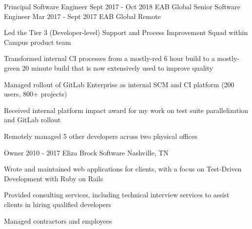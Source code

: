 \begin{cventries}
  \doublecventry
  {Principal Software Engineer}
  {Sept 2017 - Oct 2018}
  {EAB Global}
  {Senior Software Engineer}
  {Mar 2017 - Sept 2017}
  {EAB Global}
  {}
  {Remote}
  {
    \begin{cvitems}
      \item Led the Tier 3 (Developer-level) Support and Process Improvement Squad within Campus product team
      \item Transformed internal CI processes from a mostly-red 6 hour build to a mostly-green 20 minute build that is now extensively used to improve quality
      \item Managed rollout of GitLab Enterprise as internal SCM and CI platform (200 users, 800+ projects)
      \item Received internal platform impact award for my work on test suite parallelization and GitLab rollout
      \item Remotely managed 5 other developers across two physical offices
    \end{cvitems}
    \cvtags{
      \tagRuby
      \tagRails
      \tagMySQL
      \tagCIShort
      \tagTDDShort
      \tagPeopleManagement
      \tagProjectManagement
    }
  }

  \cventry
  {Owner}
  {2010 - 2017}
  {Eliza Brock Software}
  {Nashville, TN}
  {
    \begin{cvitems}
      \item Wrote and maintained web applications for clients, with a focus on Test-Driven \mbox{Development} with Ruby on Rails
      \item Provided consulting services, including technical interview services to assist clients in hiring qualified developers
      \item Managed contractors and employees
    \end{cvitems}
    \cvtags{
      \tagRuby
      \tagHAML
      \tagJavaScript
      \tagSASS
      \tagRails
      \tagPostgreSQL
      \tagCIShort
      \tagTDDShort
      \tagPairProgramming
      \tagPeopleManagement
      \tagProjectManagement
      \tagBalsamiq
      \tagECommerce
      \tagPerl
      \tagPHP
    }
  }

\end{cventries}

